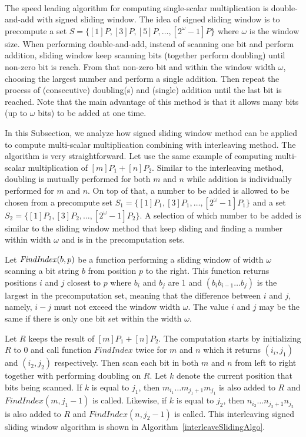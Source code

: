  \\
\label{sec:signedslide}
The speed leading algorithm for computing single-scalar multiplication is double-and-add with signed sliding window.
The idea of signed sliding window is to precompute a set $S = \{[1]P, [3]P, [5]P, \dots, [2^{\omega}-1]P\}$ where $\omega$ is the window size.
When performing double-and-add, instead of scanning one bit and perform addition,
sliding window keep scanning bits (together perform doubling) until non-zero bit is reach.
From that non-zero bit and within the window width $\omega$, choosing the largest number and perform a single addition.
Then repeat the process of (consecutive) doubling(s) and (single) addition until the last bit is reached.
Note that the main advantage of this method is that it allows many bits (up to $\omega$ bits) to be added at one time.

In this Subsection, we analyze how signed sliding window method can be applied to compute multi-scalar multiplication combining with interleaving method.
The algorithm is very straightforward.  Let use the same example of computing multi-scalar multiplication of $[m]P_1 + [n]P_2$.
Similar to the interleaving method, doubling is mutually performed for both $m$ and $n$ while addition is individually performed for $m$ and $n$.
On top of that, a number to be added is allowed to be chosen from a precompute set $S_1 = \{[1]P_1, [3]P_1, \dots, [2^{\omega}-1]P_1\}$
and a set $S_2 = \{[1]P_2, [3]P_2, \dots, [2^{\omega}-1]P_2\}$.
A selection of which number to be added is similar to the sliding window method that keep sliding and finding a number within width $\omega$ and is in the precomputation sets.

Let ${\it{FindIndex}}(b,p)$ be a function performing a sliding window of width $\omega$ scanning a bit string $b$ from position $p$ to the right.
This function returns positions $i$ and $j$ closest to $p$ where $b_i$ and $b_j$ are 1 and $(b_i b_{i-1} \dots b_j)$ is the largest in the precomputation set,
meaning that the difference between $i$ and $j$, namely, $i-j$ must not exceed the window width $\omega$.
The value $i$ and $j$ may be the same if there is only one bit set within the width $\omega$.

Let $R$ keeps the result of $[m]P_1 + [n]P_2$.  The computation starts by initializing $R$ to $0$ and call function $FindIndex$ twice for $m$ and $n$
which it returns $(i_i,j_1)$ and $(i_2,j_2)$ respectively.
Then scan each bit in both $m$ and $n$ from left to right together with performing doubling on $R$.
Let $k$ denote the current position that bits being scanned.
If $k$ is equal to $j_1$, then $m_{i_1} \dots m_{{j_1}+1} m_{j_1}$ is also added to $R$ and $FindIndex(m,j_1-1)$ is called.
Likewise, if $k$ is equal to $j_2$, then $n_{i_2} \dots n_{{j_2}+1} n_{j_2}$ is also added to $R$ and $FindIndex(n,j_2-1)$ is called.
This interleaving signed sliding window algorithm is shown in Algorithm~\ref{interleaveSlidingAlgo}.

